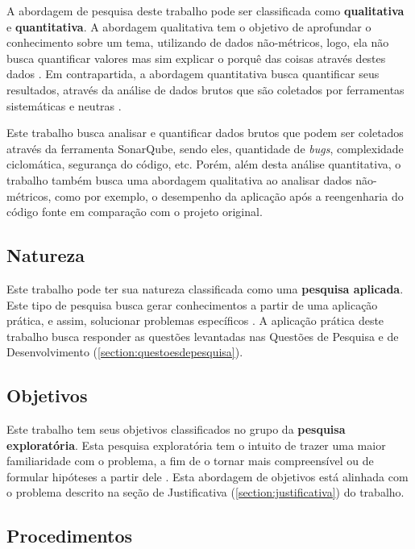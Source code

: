 A abordagem de pesquisa deste trabalho pode ser classificada como \textbf{qualitativa} e \textbf{quantitativa}. 
A abordagem qualitativa tem o objetivo de aprofundar o conhecimento sobre um tema, utilizando de dados não-métricos, 
logo, ela não busca quantificar valores mas sim explicar o porquê das coisas através destes dados . 
Em contrapartida, a abordagem quantitativa busca quantificar seus resultados, através da análise de dados 
brutos que são coletados por ferramentas sistemáticas e neutras \cite{gerhardt2009metodos}.

Este trabalho busca analisar e quantificar dados brutos que podem ser coletados através da ferramenta SonarQube, 
sendo eles, quantidade de \textit{bugs}, complexidade ciclomática, segurança do código,  etc. Porém, além desta análise 
quantitativa, o trabalho também busca uma abordagem qualitativa ao analisar dados não-métricos, como por exemplo, o 
desempenho da aplicação após a reengenharia do código fonte em comparação com o projeto original.

\subsection{Natureza}
\label{section:classificacao_natureza}

Este trabalho pode ter sua natureza classificada como uma \textbf{pesquisa aplicada}. Este tipo de 
pesquisa busca gerar conhecimentos a partir de uma aplicação prática, e assim, solucionar problemas 
específicos \cite{gerhardt2009metodos}. A aplicação prática deste trabalho busca responder as 
questões levantadas nas Questões de Pesquisa e de Desenvolvimento (\ref{section:questoesdepesquisa}).

\subsection{Objetivos}
\label{section:classificacao_objetivos}

Este trabalho tem seus objetivos classificados no grupo da \textbf{pesquisa exploratória}. 
Esta pesquisa exploratória tem o intuito de trazer uma maior familiaridade com o problema, 
a fim de o tornar mais compreensível ou de formular hipóteses a partir dele \cite{gerhardt2009metodos}. Esta abordagem de objetivos 
está alinhada com o problema descrito na seção de Justificativa (\ref{section:justificativa}) do trabalho.

\subsection{Procedimentos}
\label{section:classificacao_procedimentos}

